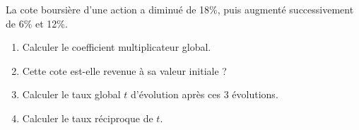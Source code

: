 
La cote boursière d'une action a diminué de 18\%, puis augmenté successivement de 6\% et 12\%.
\begin{enumerate}
\item Calculer le coefficient multiplicateur global. 
\item Cette cote est-elle revenue à sa valeur initiale ?
\item Calculer le taux global $t$ d'évolution après ces 3 évolutions.
\item Calculer le taux réciproque de $t$.
\end{enumerate}

